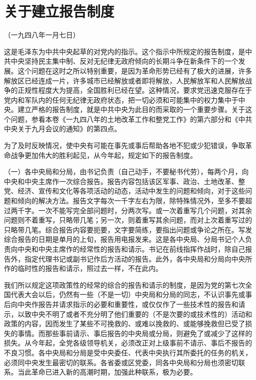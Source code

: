 \documentclass[UTF-8, a5paper, 12pt]{ctexart}
\begin{document}
\section{关于建立报告制度}

（一九四八年一月七日）

这是毛泽东为中共中央起草的对党内的指示。这个指示中所规定的报告制度，是中共中央坚持民主集中制、反对无纪律无政府倾向的长期斗争在新条件下的一个发展。这个问题在这时之所以特别重要，是因为革命形势已经有了极大的进展，许多解放区已经连成一片，许多城市已经解放或者即将解放，人民解放军和人民解放战争的正规性程度大为提高，全国胜利已经在望。这种情况，要求党迅速克服存在于党内和军队内的任何无纪律无政府状态，把一切必须和可能集中的权力集中于中央。建立严格的报告制度，就是中共中央为此目的而采取的一个重要步骤。关于这个问题，参看本卷《一九四八年的土地改革工作和整党工作》的第六部分和《中共中央关于九月会议的通知》的第四点。

为了及时反映情况，使中央有可能在事先或事后帮助各地不犯或少犯错误，争取革命战争更加伟大的胜利起见，从今年起，规定如下的报告制度。

（一）各中央局和分局，由书记负责（自己动手，不要秘书代劳），每两个月，向中央和中央主席作一次综合报告。报告内容包括该区军事、政治、土地改革、整党、经济、宣传和文化等各项活动的动态，活动中发生的问题和倾向，对于这些问题和倾向的解决方法。报告文字每次一千字左右为限，除特殊情况外，至多不要超过两千字。一次不能写完全部问题时，分两次写。或一次着重写几个问题，对其余问题则不着重写，只略带几笔；另一次，则着重写其余问题，而对上次着重写过的只略带几笔。综合报告内容要扼要，文字要简练，要指出问题或争论之所在。写发综合报告的日期是单月的上旬，报告用电报发来。这是各中央局、分局书记个人负责向中央和中央主席作的经常性的报告和请示。书记在前线指挥作战时，除自己报告外，指定代理书记或副书记作后方活动的报告。此外，各中央局和分局向中央所作的临时性的报告和请示，照过去一样，不在此内。

我们所以规定这项政策性的经常的综合的报告和请示的制度，是因为党的第七次全国代表大会以后，仍然有一些（不是一切）中央局和分局的同志，不认识事先或事后向中央作报告并请求指示的必要和重要性，或仅仅作了一些技术性的报告和请示，以致中央不明了或者不充分明了他们重要的（不是次要的或技术性的）活动和政策的内容，因而发生了某些不可挽救的、或难以挽救的、或能够挽救但已受了损失的事情。而那些事前请示、事后报告的中央局或分局，则避免了或减少了这样的损失。从今年起，全党各级领导机关，必须改正对上级事前不请示、事后不报告的不良习惯。各中央局和分局是受中央委任、代表中央执行其所委托的任务的机关，必须同中央发生最密切的联系。各省委或区党委，同各中央局和分局也须密切联系。当此革命已进入新的高潮时期，加强此种联系，极为必要。
\end{document}

